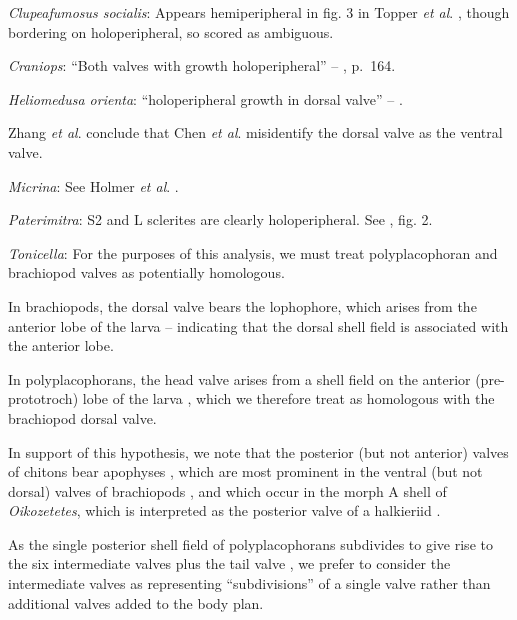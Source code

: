 \documentclass[openany]{book}
\begin{document}
\hypertarget{Clupeafumosus_socialis-coding-91}{}
\emph{Clupeafumosus socialis}: Appears hemiperipheral in fig. 3 in
Topper \emph{et al}. \citeyearpar{Topper2013Reappraisalof}, though
bordering on holoperipheral, so scored as ambiguous.

\hypertarget{Craniops-coding-91}{}
\emph{Craniops}: ``Both valves with growth holoperipheral'' --
\citet{Williams2000LinguliformeaCraniiformea}, p.~164.

\hypertarget{Heliomedusa_orienta-coding-91}{}
\emph{Heliomedusa orienta}: ``holoperipheral growth in dorsal valve'' --
\citet{Williams2007Supplement}.

Zhang \emph{et al}. \citeyearpar{Zhang2009Architectureand} conclude that
Chen \emph{et al}. \citeyearpar{Chen2007Reinterpretationof} misidentify
the dorsal valve as the ventral valve.

\hypertarget{Micrina-coding-91}{}
\emph{Micrina}: See Holmer \emph{et al}.
\citeyearpar{Holmer2008TheEarly}.

\hypertarget{Paterimitra-coding-91}{}
\emph{Paterimitra}: S2 and L sclerites are clearly holoperipheral. See
\citet{Larsson2014iPaterimitra}, fig. 2.

\hypertarget{Tonicella-coding-91}{}
\emph{Tonicella}: For the purposes of this analysis, we must treat
polyplacophoran and brachiopod valves as potentially homologous.

In brachiopods, the dorsal valve bears the lophophore, which arises from
the anterior lobe of the larva \citep{Altenburger2013} -- indicating
that the dorsal shell field is associated with the anterior lobe.

In polyplacophorans, the head valve arises from a shell field on the
anterior (pre-prototroch) lobe of the larva \citep{Wanninger2002C},
which we therefore treat as homologous with the brachiopod dorsal valve.

In support of this hypothesis, we note that the posterior (but not
anterior) valves of chitons bear apophyses
\citep{Schwabe2010, Connors2012}, which are most prominent in the
ventral (but not dorsal) valves of brachiopods \citep[fig.
322]{Williams1997Introduction}, and which occur in the morph A shell of
\emph{Oikozetetes}, which is interpreted as the posterior valve of a
halkieriid \citep{Paterson2009}.

As the single posterior shell field of polyplacophorans subdivides to
give rise to the six intermediate valves plus the tail valve
\citep{Wanninger2002C}, we prefer to consider the intermediate valves as
representing ``subdivisions'' of a single valve rather than additional
valves added to the body plan.
\end{document}
